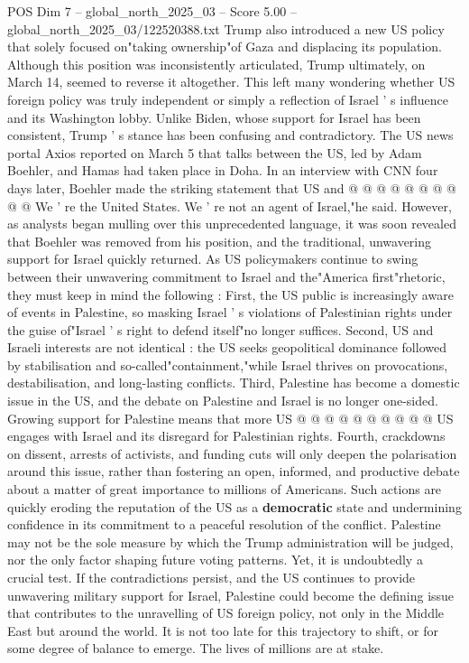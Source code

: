 \begin{textsample}{POS Dim 7 – global\_north\_2025\_03 – Score 5.00 – global\_north\_2025\_03/122520388.txt}
Trump also introduced a new US policy that solely focused on"taking ownership"of Gaza and displacing its population.
Although this position was inconsistently articulated, Trump ultimately, on March 14, seemed to reverse it altogether.
This left many wondering whether US foreign policy was truly independent or simply a reflection of Israel ' s influence and its Washington lobby.
Unlike Biden, whose support for Israel has been consistent, Trump ' s stance has been confusing and contradictory.
The US news portal Axios reported on March 5 that talks between the US, led by Adam Boehler, and Hamas had taken place in Doha.
In an interview with CNN four days later, Boehler made the striking statement that US and @ @ @ @ @ @ @ @ @ @ We ' re the United States.
We ' re not an agent of Israel,"he said.
However, as analysts began mulling over this unprecedented language, it was soon revealed that Boehler was removed from his position, and the traditional, unwavering support for Israel quickly returned.
As US policymakers continue to swing between their unwavering commitment to Israel and the"America first"rhetoric, they must keep in mind the following : First, the US public is increasingly aware of events in Palestine, so masking Israel ' s violations of Palestinian rights under the guise of"Israel ' s right to defend itself"no longer suffices.
Second, US and Israeli interests are not identical : the US seeks geopolitical dominance followed by stabilisation and so-called"containment,"while Israel thrives on provocations, destabilisation, and long-lasting conflicts.
Third, Palestine has become a domestic issue in the US, and the debate on Palestine and Israel is no longer one-sided.
Growing support for Palestine means that more US @ @ @ @ @ @ @ @ @ @ US engages with Israel and its disregard for Palestinian rights.
Fourth, crackdowns on dissent, arrests of activists, and funding cuts will only deepen the polarisation around this issue, rather than fostering an open, informed, and productive debate about a matter of great importance to millions of Americans.
Such actions are quickly eroding the reputation of the US as a \textbf{democratic} state and undermining confidence in its commitment to a peaceful resolution of the conflict.
Palestine may not be the sole measure by which the Trump administration will be judged, nor the only factor shaping future voting patterns.
Yet, it is undoubtedly a crucial test.
If the contradictions persist, and the US continues to provide unwavering military support for Israel, Palestine could become the defining issue that contributes to the unravelling of US foreign policy, not only in the Middle East but around the world.
It is not too late for this trajectory to shift, or for some degree of balance to emerge.
The lives of millions are at stake.

\end{textsample}

